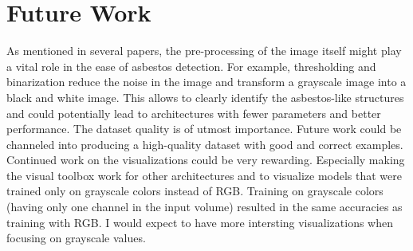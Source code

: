 \section{Future Work}

As mentioned in several papers, the pre-processing of the image itself might play a vital role in the ease of asbestos detection. For example, thresholding and binarization reduce the noise in the image and transform a grayscale image into a black and white image. This allows to clearly identify the asbestos-like structures and could potentially lead to architectures with fewer parameters and better performance.
The dataset quality is of utmost importance. Future work could be channeled into producing a high-quality dataset with good and correct examples.
Continued work on the visualizations could be very rewarding. Especially making the visual toolbox work for other architectures and to visualize models that were trained only on grayscale colors instead of RGB. Training on grayscale colors (having only one channel in the input volume) resulted in the same accuracies as training with RGB. I would expect to have more intersting visualizations when focusing on grayscale values.